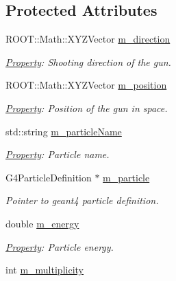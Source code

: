 \subsection*{Protected Attributes}
\begin{DoxyCompactItemize}
\item 
R\+O\+O\+T\+::\+Math\+::\+X\+Y\+Z\+Vector \hyperlink{class_d_d4hep_1_1_simulation_1_1_geant4_particle_generator_a2e9c3184ff8999d4e55e3158e3b43727}{m\+\_\+direction}
\begin{DoxyCompactList}\small\item\em \hyperlink{class_d_d4hep_1_1_property}{Property}\+: Shooting direction of the gun. \end{DoxyCompactList}\item 
R\+O\+O\+T\+::\+Math\+::\+X\+Y\+Z\+Vector \hyperlink{class_d_d4hep_1_1_simulation_1_1_geant4_particle_generator_a6ee07c5b63244214bb70499dd66eb26a}{m\+\_\+position}
\begin{DoxyCompactList}\small\item\em \hyperlink{class_d_d4hep_1_1_property}{Property}\+: Position of the gun in space. \end{DoxyCompactList}\item 
std\+::string \hyperlink{class_d_d4hep_1_1_simulation_1_1_geant4_particle_generator_ae7181a20c8374bee76cd7d29ea0e7dc7}{m\+\_\+particle\+Name}
\begin{DoxyCompactList}\small\item\em \hyperlink{class_d_d4hep_1_1_property}{Property}\+: Particle name. \end{DoxyCompactList}\item 
G4\+Particle\+Definition $\ast$ \hyperlink{class_d_d4hep_1_1_simulation_1_1_geant4_particle_generator_a9f974a1df5025bb1ff4f65d6ed73bbd1}{m\+\_\+particle}
\begin{DoxyCompactList}\small\item\em Pointer to geant4 particle definition. \end{DoxyCompactList}\item 
double \hyperlink{class_d_d4hep_1_1_simulation_1_1_geant4_particle_generator_a0177e67af8736780fa0e401d598a792f}{m\+\_\+energy}
\begin{DoxyCompactList}\small\item\em \hyperlink{class_d_d4hep_1_1_property}{Property}\+: Particle energy. \end{DoxyCompactList}\item 
int \hyperlink{class_d_d4hep_1_1_simulation_1_1_geant4_particle_generator_a366bf41f1de7a3e605ec7f2ecc220b39}{m\+\_\+multiplicity}

\end{DoxyCompactItemize}

